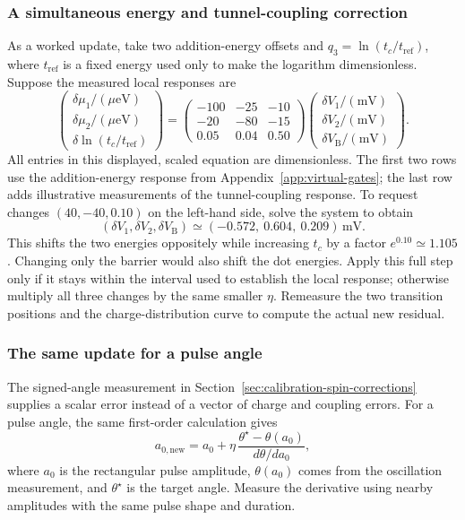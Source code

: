 \subsubsection{A simultaneous energy and tunnel-coupling correction}
As a worked update, take two addition-energy offsets and
$q_3=\ln(t_c/t_{\mathrm{ref}})$, where $t_{\mathrm{ref}}$ is a
fixed energy used only to make the logarithm dimensionless.
Suppose the measured local responses are
\begin{equation}
 \begin{pmatrix}
 \delta\mu_1/(\mu\mathrm{eV})\\
 \delta\mu_2/(\mu\mathrm{eV})\\
 \delta\ln(t_c/t_{\mathrm{ref}})
 \end{pmatrix}
 =
 \begin{pmatrix}
 -100&-25&-10\\
 -20&-80&-15\\
 0.05&0.04&0.50
 \end{pmatrix}
 \begin{pmatrix}
 \delta V_1/(\mathrm{mV})\\
 \delta V_2/(\mathrm{mV})\\
 \delta V_{\mathrm B}/(\mathrm{mV})
 \end{pmatrix}.
 \label{eq:calibration-feedback-example}
\end{equation}
All entries in this displayed, scaled equation are dimensionless.
The first two rows use the addition-energy response from
Appendix~\ref{app:virtual-gates}; the last row
adds illustrative measurements of the tunnel-coupling response.
To request changes $(40,-40,0.10)$ on the left-hand side, solve
the system to obtain
\[
 (\delta V_1,\delta V_2,\delta V_{\mathrm B})
 \simeq(-0.572,\ 0.604,\ 0.209)\,\mathrm{mV}.
\]
This shifts the two energies oppositely while increasing $t_c$
by a factor $e^{0.10}\simeq1.105$. Changing only the barrier
would also shift the dot energies. Apply this full step only if
it stays within the interval used to establish the local response;
otherwise multiply all three changes by the same smaller $\eta$.
Remeasure the two transition positions and the charge-distribution
curve to compute the actual new residual.

\subsubsection{The same update for a pulse angle}
The signed-angle measurement in
Section~\ref{sec:calibration-spin-corrections} supplies a scalar
error instead of a vector of charge and coupling errors.
For a pulse angle, the same first-order calculation gives
\[
 a_{0,\mathrm{new}}=a_0+
 \eta\,\frac{\theta^\star-\theta(a_0)}{d\theta/da_0},
\]
where $a_0$ is the rectangular pulse amplitude, $\theta(a_0)$ comes from
the oscillation measurement, and $\theta^\star$ is the target angle.
Measure the derivative using nearby amplitudes with the same
pulse shape and duration.

